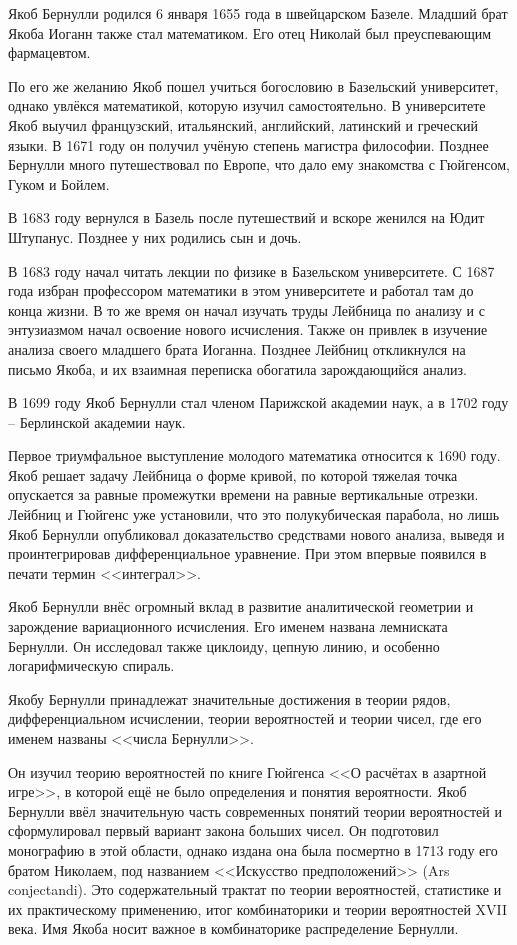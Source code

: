 \documentclass[12pt]{article}
\begin{document}
Якоб Бернулли родился 6 января 1655 года в швейцарском Базеле.
Младший брат Якоба Иоганн также стал математиком.
Его отец Николай был преуспевающим фармацевтом. 

По его же желанию Якоб пошел учиться богословию в Базельский университет, однако увлёкся математикой, которую изучил самостоятельно. 
В университете Якоб выучил французский, итальянский, английский, латинский и греческий языки.
В 1671 году он получил учёную степень магистра философии.
Позднее Бернулли много путешествовал по Европе, что дало ему знакомства с Гюйгенсом, Гуком и Бойлем.

В 1683 году вернулся в Базель после путешествий и вскоре женился на Юдит Штупанус. Позднее у них родились сын и дочь.

В 1683 году начал читать лекции по физике в Базельском университете. 
С 1687 года избран профессором математики в этом университете и работал там до конца жизни.
В то же время он начал изучать труды Лейбница по анализу и с энтузиазмом начал освоение нового исчисления. Также он привлек в изучение анализа своего младшего брата Иоганна.
Позднее Лейбниц откликнулся на письмо Якоба, и их взаимная переписка обогатила зарождающийся анализ.

В 1699 году Якоб Бернулли стал членом Парижской академии наук, а в 1702 году -- Берлинской академии наук.

Первое триумфальное выступление молодого математика относится к 1690 году. Якоб решает задачу Лейбница о форме кривой, по которой тяжелая точка опускается за равные промежутки времени на равные вертикальные отрезки. Лейбниц и Гюйгенс уже установили, что это полукубическая парабола, но лишь Якоб Бернулли опубликовал доказательство средствами нового анализа, выведя и проинтегрировав дифференциальное уравнение. При этом впервые появился в печати термин <<интеграл>>.

Якоб Бернулли внёс огромный вклад в развитие аналитической геометрии и зарождение вариационного исчисления. Его именем названа лемниската Бернулли. Он исследовал также циклоиду, цепную линию, и особенно логарифмическую спираль.

Якобу Бернулли принадлежат значительные достижения в теории рядов, дифференциальном исчислении, теории вероятностей и теории чисел, где его именем названы <<числа Бернулли>>.

Он изучил теорию вероятностей по книге Гюйгенса <<О расчётах в азартной игре>>, в которой ещё не было определения и понятия вероятности. 
Якоб Бернулли ввёл значительную часть современных понятий теории вероятностей и сформулировал первый вариант закона больших чисел. 
Он подготовил монографию в этой области, однако издана она была посмертно в 1713 году его братом Николаем, под названием <<Искусство предположений>> (Ars conjectandi). 
Это содержательный трактат по теории вероятностей, статистике и их практическому применению, итог комбинаторики и теории вероятностей XVII века.
Имя Якоба носит важное в комбинаторике распределение Бернулли.
\end{document}
